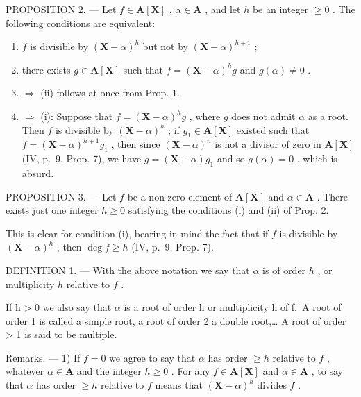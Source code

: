 PROPOSITION 2. --- Let \(f \in \mathbf{A}[\mathbf{X}]\) , \(\alpha \in \mathbf{A}\) , and let \(h\) be an integer \(\geqslant 0\) . The following conditions are equivalent:

\begin{enumerate}
\def\labelenumi{(\roman{enumi})}
\item
  \(f\) is divisible by \((\mathbf{X} - \alpha)^h\) but not by \((\mathbf{X} - \alpha)^{h + 1}\) ;
\item
  there exists \(g \in \mathbf{A}[\mathbf{X}]\) such that \(f = (\mathbf{X} - \alpha)^h g\) and \(g(\alpha) \neq 0\) .
\item
  \(\Rightarrow\) (ii) follows at once from Prop. 1.
\item
  \(\Rightarrow\) (i): Suppose that \(f = (\mathbf{X} - \alpha)^h g\) , where \(g\) does not admit \(\alpha\) as a root. Then \(f\) is divisible by \((\mathbf{X} - \alpha)^h\) ; if \(g_1 \in \mathbf{A}[\mathbf{X}]\) existed such that \(f = (\mathbf{X} - \alpha)^{h + 1}g_1\) , then since \((\mathbf{X} - \alpha)^n\) is not a divisor of zero in \(\mathbf{A}[\mathbf{X}]\) (IV, p.~9, Prop. 7), we have \(g = (\mathbf{X} - \alpha)g_1\) and so \(g(\alpha) = 0\) , which is absurd.
\end{enumerate}

PROPOSITION 3. --- Let \(f\) be a non-zero element of \(\mathbf{A}[\mathbf{X}]\) and \(\alpha \in \mathbf{A}\) . There exists just one integer \(h \geqslant 0\) satisfying the conditions (i) and (ii) of Prop. 2.

This is clear for condition (i), bearing in mind the fact that if \(f\) is divisible by \((\mathbf{X} - \alpha)^h\) , then \(\deg f \geqslant h\) (IV, p.~9, Prop. 7).

DEFINITION 1. --- With the above notation we say that \(\alpha\) is of order \(h\) , or multiplicity \(h\) relative to \(f\) .

If h \textgreater{} 0 we also say that \(\alpha\) is a root of order h or multiplicity h of f.~A root of order 1 is called a simple root, a root of order 2 a double root,\ldots{} A root of order \textgreater{} 1 is said to be multiple.

Remarks. --- 1) If \(f=0\) we agree to say that \(\alpha\) has order \(\geqslant h\) relative to \(f\) , whatever \(\alpha\in\mathbf{A}\) and the integer \(h\geqslant0\) . For any \(f\in\mathbf{A}[\mathbf{X}]\) and \(\alpha\in\mathbf{A}\) , to say that \(\alpha\) has order \(\geqslant h\) relative to \(f\) means that \((\mathbf{X}-\alpha)^{h}\) divides \(f\) .

